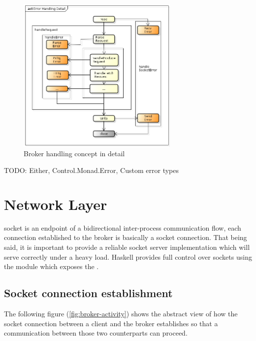 \begin{figure}[H]
    \centering
    \includegraphics[width=0.7\textwidth]{images/broker-error-activity-detail.png}
    \caption{Broker handling concept in detail}
    \label{fig:broker-error-activity-detail.png}
\end{figure}

TODO: Either, Control.Monad.Error, Custom error types


\section{Network Layer}

socket is an endpoint of a bidirectional inter-process communication flow, each
connection established to the broker is basically a socket connection. That
being said, it is important to provide a reliable socket server implementation
which will serve correctly under a heavy load. Haskell provides full control
over sockets using the
module which exposes the .

\subsection{Socket connection establishment}

The following figure (\ref{fig:broker-activity}) shows the abstract view of how
the socket connection between a client and the broker establishes so that a
communication between those two counterparts can proceed.

